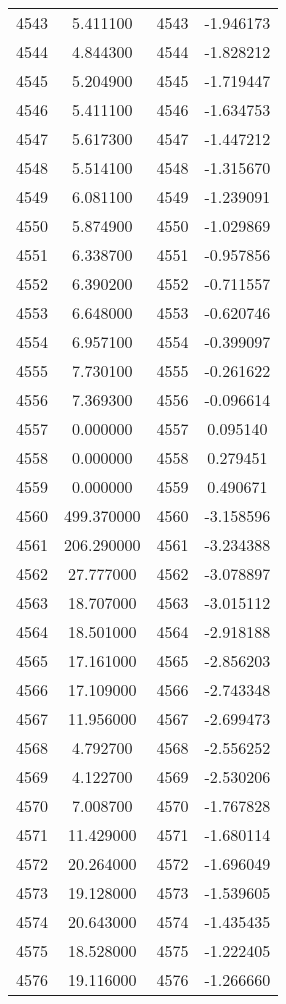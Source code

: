 \documentclass[12pt]{article}
\begin{document}
\begin{longtable}{@{}cccc@{}}
4543 & 5.411100 & 4543 & -1.946173 \\
4544 & 4.844300 & 4544 & -1.828212 \\
4545 & 5.204900 & 4545 & -1.719447 \\
4546 & 5.411100 & 4546 & -1.634753 \\
4547 & 5.617300 & 4547 & -1.447212 \\
4548 & 5.514100 & 4548 & -1.315670 \\
4549 & 6.081100 & 4549 & -1.239091 \\
4550 & 5.874900 & 4550 & -1.029869 \\
4551 & 6.338700 & 4551 & -0.957856 \\
4552 & 6.390200 & 4552 & -0.711557 \\
4553 & 6.648000 & 4553 & -0.620746 \\
4554 & 6.957100 & 4554 & -0.399097 \\
4555 & 7.730100 & 4555 & -0.261622 \\
4556 & 7.369300 & 4556 & -0.096614 \\
4557 & 0.000000 & 4557 & 0.095140 \\
4558 & 0.000000 & 4558 & 0.279451 \\
4559 & 0.000000 & 4559 & 0.490671 \\
4560 & 499.370000 & 4560 & -3.158596 \\
4561 & 206.290000 & 4561 & -3.234388 \\
4562 & 27.777000 & 4562 & -3.078897 \\
4563 & 18.707000 & 4563 & -3.015112 \\
4564 & 18.501000 & 4564 & -2.918188 \\
4565 & 17.161000 & 4565 & -2.856203 \\
4566 & 17.109000 & 4566 & -2.743348 \\
4567 & 11.956000 & 4567 & -2.699473 \\
4568 & 4.792700 & 4568 & -2.556252 \\
4569 & 4.122700 & 4569 & -2.530206 \\
4570 & 7.008700 & 4570 & -1.767828 \\
4571 & 11.429000 & 4571 & -1.680114 \\
4572 & 20.264000 & 4572 & -1.696049 \\
4573 & 19.128000 & 4573 & -1.539605 \\
4574 & 20.643000 & 4574 & -1.435435 \\
4575 & 18.528000 & 4575 & -1.222405 \\
4576 & 19.116000 & 4576 & -1.266660 \\

\end{longtable}
\end{document}
